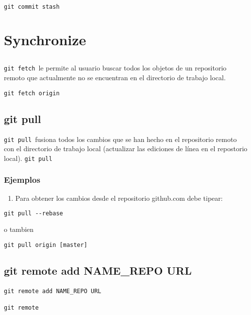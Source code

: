\documentclass[
  a2paper,
]{article}
\providecommand{\tightlist}{%
  \setlength{\itemsep}{0pt}\setlength{\parskip}{0pt}}\usepackage{longtable,booktabs,array}
\begin{document}
\texttt{git\ commit\ stash}

\hypertarget{synchronize}{%
\section{Synchronize}\label{synchronize}}

\hypertarget{section}{%
\subsection{}\label{section}}

\texttt{git\ fetch}~le permite al usuario buscar todos los objetos de un
repositorio remoto que actualmente no se encuentran en el directorio de
trabajo local.

\texttt{git\ fetch\ origin}

\hypertarget{git-pull}{%
\subsection{git pull}\label{git-pull}}

\texttt{git\ pull}~fusiona todos los cambios que se han hecho en el
repositorio remoto con el directorio de trabajo local (actualizar las
ediciones de línea en el repostorio local). \texttt{git\ pull}

\hypertarget{ejemplos-4}{%
\subsubsection{Ejemplos}\label{ejemplos-4}}

\begin{enumerate}
\def\labelenumi{\arabic{enumi})}
\tightlist
\item
  Para obtener los cambios desde el repositorio github.com debe tipear:
\end{enumerate}

\texttt{git\ pull\ -\/-rebase}

o tambien

\texttt{git\ pull\ origin~{[}master{]}}

\hypertarget{git-remote-add-name_repo-url}{%
\subsection{git remote add NAME\_REPO
URL}\label{git-remote-add-name_repo-url}}

\texttt{git\ remote\ add\ NAME\_REPO\ URL}~~

\texttt{git\ remote}~~
\end{document}
